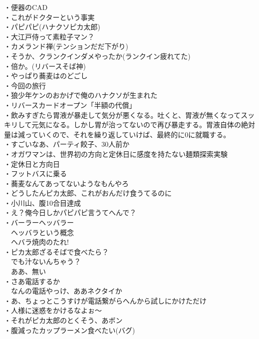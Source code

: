 ・便器のCAD\\
・これがドクターという事実\\
・パピパピ(ハナクソピカ太郎)\\
・大江戸侍って素粒子マン？\\
・カメランド禅(テンションだだ下がり)\\
・そうか、クランクインダメやったか(ランクイン疲れてた)\\
・倍か。(リバースそば神)\\
・やっぱり蕎麦はのどごし\\
・今回の旅行\\
・狼少年ケンのおかげで俺のハナクソが生まれた\\
・リバースカードオープン「半額の代償」\\
・飲みすぎたら胃液が暴走して気分が悪くなる。吐くと、胃液が無くなってスッキリして元気になる。しかし胃が治ってないので再び暴走する。胃液自体の絶対量は減っていくので、それを繰り返していけば、最終的に0に就職する。\\
・すごいなあ、パーティ餃子、30人前か\\
・オガワマンは、世界初の方向と定休日に感度を持たない麺類探索実験\\
・定休日と方向日\\
・フットバスに乗る\\
・蕎麦なんてあってないようなもんやろ\\
・どうしたんピカ太郎、これがおんだけ食うてるのに\\
・小川山、腹10合目達成\\
・え？俺今日しかパピパピ言うてへんで？\\
・バーラーヘッバラー\\
　ヘッバラという概念\\
　ヘバラ焼肉のたれ!\\
・ピカ太郎ざるそばで食べたら？\\
　でも汁ないんちゃう？\\
　ああ、無い\\
・さあ電話するか\\
　なんの電話やっけ、ああネクタイか\\
・あ、ちょっとこうすけが電話繋がらへんから試しにかけただけ\\
・人様に迷惑をかけるなよぉ〜\\
・それがピカ太郎のとくそう、あボン\\
・腹減ったカップラーメン食べたい(バグ)\\
